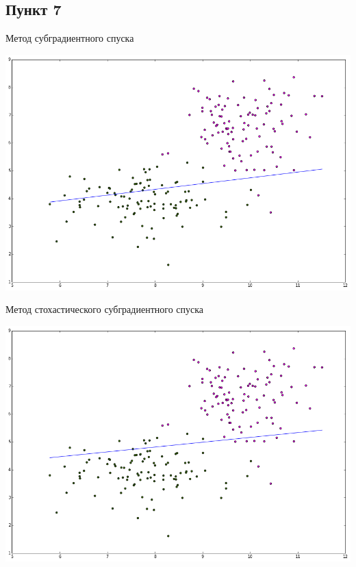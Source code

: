 \documentclass[12pt, a4paper]{article}
\begin{document}
		\subsection{Пункт 7}
			Метод субградиентного спуска
			\begin{center}
				\includegraphics[width=16cm]{7par_grad.png}
			\end{center}

			Метод стохастического субградиентного спуска
			\begin{center}
				\includegraphics[width=16cm]{7par_st_grad.png}
			\end{center}

			~\newline
			
\end{document}
